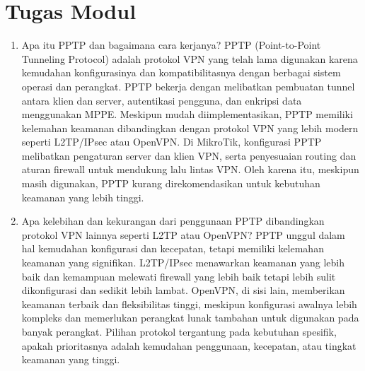 \section*{Tugas Modul} %
\begin{enumerate}
    \item Apa itu PPTP dan bagaimana cara kerjanya?
    PPTP (Point-to-Point Tunneling Protocol) adalah protokol VPN yang telah lama digunakan karena kemudahan konfigurasinya dan kompatibilitasnya dengan berbagai sistem operasi dan perangkat. PPTP bekerja dengan melibatkan pembuatan tunnel antara klien dan server, autentikasi pengguna, dan enkripsi data menggunakan MPPE. Meskipun mudah diimplementasikan, PPTP memiliki kelemahan keamanan dibandingkan dengan protokol VPN yang lebih modern seperti L2TP/IPsec atau OpenVPN. Di MikroTik, konfigurasi PPTP melibatkan pengaturan server dan klien VPN, serta penyesuaian routing dan aturan firewall untuk mendukung lalu lintas VPN. Oleh karena itu, meskipun masih digunakan, PPTP kurang direkomendasikan untuk kebutuhan keamanan yang lebih tinggi.

    \item Apa kelebihan dan kekurangan dari penggunaan PPTP dibandingkan protokol VPN lainnya seperti L2TP atau OpenVPN?
    PPTP unggul dalam hal kemudahan konfigurasi dan kecepatan, tetapi memiliki kelemahan keamanan yang signifikan. L2TP/IPsec menawarkan keamanan yang lebih baik dan kemampuan melewati firewall yang lebih baik tetapi lebih sulit dikonfigurasi dan sedikit lebih lambat. OpenVPN, di sisi lain, memberikan keamanan terbaik dan fleksibilitas tinggi, meskipun konfigurasi awalnya lebih kompleks dan memerlukan perangkat lunak tambahan untuk digunakan pada banyak perangkat. Pilihan protokol tergantung pada kebutuhan spesifik, apakah prioritasnya adalah kemudahan penggunaan, kecepatan, atau tingkat keamanan yang tinggi.
\end{enumerate}